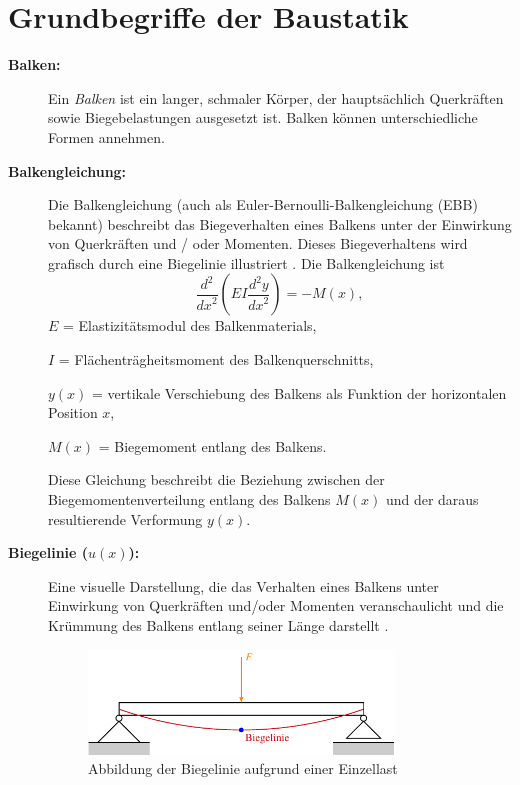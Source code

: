 %
%
%
%
\section{Grundbegriffe der Baustatik}
\label{balken:section:teil1}
\begin{description}
\item[\textbf{Balken:}] Ein {\em Balken} ist ein langer, schmaler Körper, der hauptsächlich Querkräften sowie Biegebelastungen ausgesetzt ist.
%
Balken können unterschiedliche Formen annehmen.

\item[\textbf{Balkengleichung:}] Die Balkengleichung (auch als Euler-Bernoulli-Balkengleichung (EBB) bekannt) beschreibt das Biegeverhalten eines Balkens unter der Einwirkung von Querkräften und / oder Momenten.
%
%
Dieses Biegeverhaltens wird grafisch durch eine Biegelinie illustriert \cite{balken:Biegelinie}. 
Die Balkengleichung ist
\begin{equation}
	\frac{d^2}{{dx}^2}\left(EI\frac{d^2y}{{dx}^2}\right)
	=-M(x),
\end{equation}
$E$ = Elastizitätsmodul des Balkenmaterials,

$I$ = Flächenträgheitsmoment des Balkenquerschnitts,

$y(x)$ = vertikale Verschiebung des Balkens als Funktion der horizontalen Position $x$,

$M(x)$ = Biegemoment entlang des Balkens.

Diese Gleichung beschreibt die Beziehung zwischen der Biegemomentenverteilung entlang des Balkens $M(x)$ und der daraus resultierende Verformung $y(x)$.

\item[\textbf{Biegelinie ($u(x)$):}] Eine visuelle Darstellung, die das Verhalten eines Balkens unter Einwirkung von Querkräften und/oder Momenten veranschaulicht und die Krümmung des Balkens entlang seiner Länge darstellt \cite{balken:Biegelinie}.
%
\begin{figure}
	\centering
	\includegraphics[width=0.8\textwidth]{papers/balken/images/teil1/Biegelinie1.pdf}
	\caption{Abbildung der Biegelinie aufgrund einer Einzellast}
	\label{fig:Abbildung der Biegelinie aufgrund einer Einzellast}
\end{figure}


\end{description}
